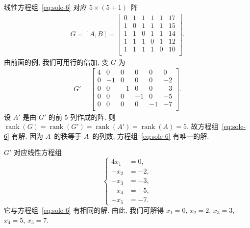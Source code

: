 \documentclass[../libro.tex]{subfiles}
\begin{document}
\begin{example}
    线性方程组~\eqref{eq:sole-6}
    对应 \(5 \times (5 + 1)\)~阵
    \begin{align*}
        G = [A, B] =
        \begin{bmatrix}
            0 & 1 & 1 & 1 & 1 & 17 \\
            1 & 0 & 1 & 1 & 1 & 15 \\
            1 & 1 & 0 & 1 & 1 & 14 \\
            1 & 1 & 1 & 0 & 1 & 12 \\
            1 & 1 & 1 & 1 & 0 & 10 \\
        \end{bmatrix}.
    \end{align*}
    由前面的例, 我们可用行的倍加, 变 \(G\) 为
    \begin{align*}
        G' =
        \begin{bmatrix}
            4 & 0  & 0  & 0  & 0  & 0  \\
            0 & -1 & 0  & 0  & 0  & -2 \\
            0 & 0  & -1 & 0  & 0  & -3 \\
            0 & 0  & 0  & -1 & 0  & -5 \\
            0 & 0  & 0  & 0  & -1 & -7 \\
        \end{bmatrix}.
    \end{align*}
    设 \(A'\) 是由 \(G'\) 的前 \(5\) 列作成的阵.
    则
    \(\operatorname{rank} {(G)}
        = \operatorname{rank} {(G')}
        = \operatorname{rank} {(A')}
        = \operatorname{rank} {(A)}
    = 5\).
    故方程组~\eqref{eq:sole-6} 有解.
    因为 \(A\)~的秩等于 \(A\)~的列数,
    方程组~\eqref{eq:sole-6} 有唯一的解.

    \(G'\) 对应线性方程组
    \begin{equation*}
        \left\{ %
        \begin{aligned}
            4 x_1 & = 0,  \\
            - x_2 & = -2, \\
            - x_3 & = -3, \\
            - x_4 & = -5, \\
            - x_5 & = -7.
        \end{aligned}
        \right. %
    \end{equation*}
    它与方程组~\eqref{eq:sole-6} 有相同的解.
    由此, 我们可解得
    \(x_1 = 0\), \(x_2 = 2\), \(x_3 = 3\),
    \(x_4 = 5\), \(x_5 = 7\).


\end{example}
\end{document}
